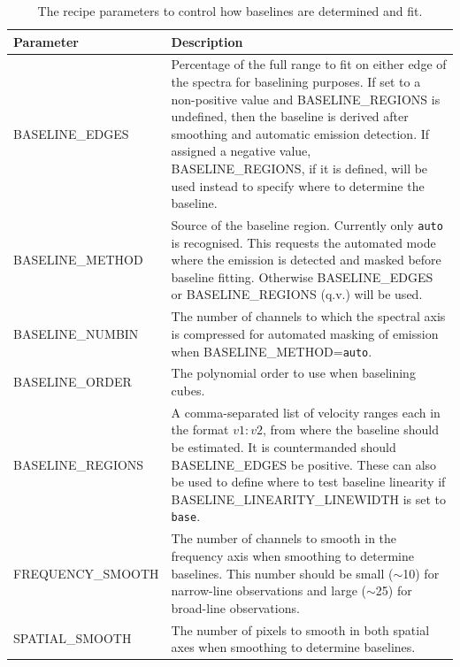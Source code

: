 \documentclass[11pt,oneside,chapters]{starlink}
\begin{document}
\begin{table}[h!]
\begin{small}
\begin{tabular}{|p{6.8cm}|p{8.6cm}|}
\hline
\textbf{Parameter} & \textbf{Description} \\
\hline
BASELINE\_EDGES & Percentage of the full range to fit on either edge of the spectra
                  for baselining purposes.  If set to a non-positive value and
                  BASELINE\_REGIONS is undefined, then the baseline is derived after
                  smoothing and automatic emission detection.  If assigned a negative
                  value, BASELINE\_REGIONS, if it is defined, will be used instead to
                  specify where to determine the baseline. \\
\hline
BASELINE\_METHOD & Source of the baseline region.  Currently only \texttt{auto}
                   is recognised.  This requests the automated mode where the emission
                   is detected and masked before baseline fitting.  Otherwise
                   BASELINE\_EDGES or BASELINE\_REGIONS (q.v.) will be used. \\
\hline
BASELINE\_NUMBIN & The number of channels to which the spectral axis is compressed
                    for automated masking of emission when BASELINE\_METHOD=\texttt{auto}. \\
\hline
BASELINE\_ORDER & The polynomial order to use when baselining cubes.\\
\hline
BASELINE\_REGIONS & A comma-separated list of velocity ranges each in the format
                    $v1:v2$, from where the baseline should be estimated.  It is
                    countermanded should BASELINE\_EDGES be positive.  These can also
                    be used to define where to test baseline linearity if
                    BASELINE\_LINEARITY\_LINEWIDTH is set to \texttt{base}. \\
\hline
FREQUENCY\_SMOOTH & The number of channels to smooth in the frequency axis when
                    smoothing to determine baselines.  This number should be small
                    ($\sim$10) for narrow-line observations and large
                    ($\sim$25) for broad-line observations. \\
SPATIAL\_SMOOTH & The number of pixels to smooth in both spatial axes when
                  smoothing to determine baselines. \\
\hline
\end{tabular}
\end{small}
\caption{\label{tab:bsfit_params}
  The recipe parameters to control how baselines are determined and fit.}
\end{table}
\end{document}
